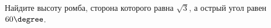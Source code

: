 \begin{ex}
	\begin{condition}
		Найдите высоту ромба, сторона которого равна \( \sqrt{3} \), а острый угол равен \( 60\degree\).
	\end{condition}
\end{ex}